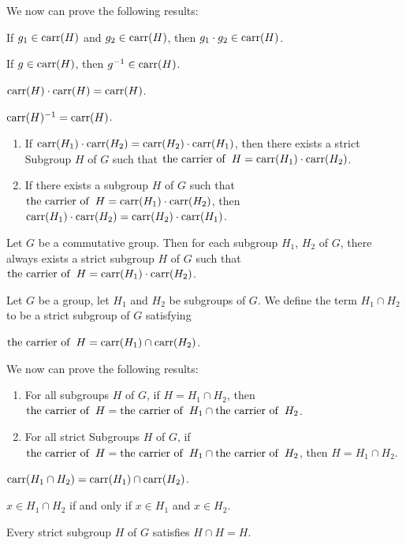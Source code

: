 \documentclass{article}
\begin{document}
We now can prove the following results:
\begin{thm}
\item\label{group2:74} If $g_{1}\in\operatorname{carr}(H)$ and $g_{2}\in\operatorname{carr}(H)$,
  then $g_{1}\cdot g_{2}\in\operatorname{carr}(H)$.
\item\label{group2:75} If $g\in\operatorname{carr}(H)$, then $g^{-1}\in\operatorname{carr}(H)$.
\item\label{group2:76} $\operatorname{carr}(H)\cdot\operatorname{carr}(H)=\operatorname{carr}(H)$.
\item\label{group2:77} $\operatorname{carr}(H)^{-1}=\operatorname{carr}(H)$.
\item\label{group2:78} \begin{enumerate}[label=(\roman*)]
\item If $\operatorname{carr}(H_{1})\cdot\operatorname{carr}(H_{2})=\operatorname{carr}(H_{2})\cdot\operatorname{carr}(H_{1})$,
  then there exists a strict Subgroup $H$ of $G$ such that $\operatorname{the\ carrier\ of\ }H=\operatorname{carr}(H_{1})\cdot\operatorname{carr}(H_{2})$.
\item If there exists a subgroup $H$ of $G$ such that $\operatorname{the\ carrier\ of\ }H=\operatorname{carr}(H_{1})\cdot\operatorname{carr}(H_{2})$,
  then $\operatorname{carr}(H_{1})\cdot\operatorname{carr}(H_{2})=\operatorname{carr}(H_{2})\cdot\operatorname{carr}(H_{1})$.
\end{enumerate}
\item\label{group2:79} Let $G$ be a commutative group. Then for each
  subgroup $H_{1}$, $H_{2}$ of $G$, there always exists a strict
  subgroup $H$ of $G$ such that $\operatorname{the\ carrier\ of\ }H=\operatorname{carr}(H_{1})\cdot\operatorname{carr}(H_{2})$.
\end{thm}

\begin{definition}
Let $G$ be a group, let $H_{1}$ and $H_{2}$ be subgroups of $G$.
We define the term $H_{1}\cap H_{2}$ to be a strict subgroup of $G$
satisfying
\begin{defn}
\item $\operatorname{the\ carrier\ of\ }H=\operatorname{carr}(H_{1})\cap\operatorname{carr}(H_{2})$.
\end{defn}
\end{definition}

We now can prove the following results:
\begin{thm}
\item\label{group2:80} \begin{enumerate}[label=(\roman*)]
\item For all subgroups $H$ of $G$, if $H= H_{1}\cap H_{2}$, then $\operatorname{the\ carrier\ of\ }H=\operatorname{the\ carrier\ of\ }H_{1}\cap\operatorname{the\ carrier\ of\ }H_{2}$.
\item For all strict Subgroups $H$ of $G$, if
  $\operatorname{the\ carrier\ of\ }H=\operatorname{the\ carrier\ of\ }H_{1}\cap\operatorname{the\ carrier\ of\ }H_{2}$,
  then $H=H_{1}\cap H_{2}$.
\end{enumerate}
\item\label{group2:81} $\operatorname{carr}(H_{1}\cap H_{2})=\operatorname{carr}(H_{1})\cap\operatorname{carr}(H_{2})$.
\item\label{group2:82} $x\in H_{1}\cap H_{2}$ if and only if $x\in H_{1}$ and $x\in H_{2}$.
\item\label{group2:83} Every strict subgroup $H$ of $G$ satisfies $H\cap H=H$.
\end{thm}
\end{document}
